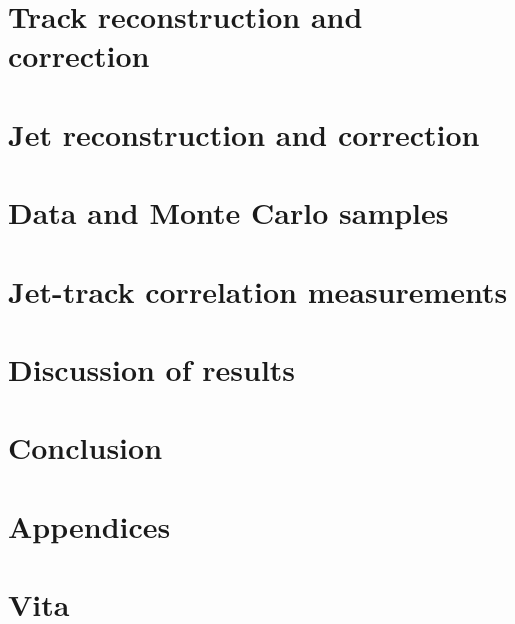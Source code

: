\documentclass[11pt]{article}
\begin{document}
\section{Track reconstruction and correction}
\label{sec:Tracks}

\clearpage

\section{Jet reconstruction and correction}
\label{sec:Jets}

\clearpage

\section{Data and Monte Carlo samples}
\label{sec:Samples}

\clearpage


\section{Jet-track correlation measurements}
\label{sec:JetTrack}

\clearpage

\section{Discussion of results}
\label{sec:Results}

\clearpage

\section{Conclusion}
\label{sec:Conclusion}

\clearpage




\clearpage


\appendix

\appendix
\section*{Appendices}
\renewcommand{\thesubsection}{\Alph{subsection}}


\clearpage

\section*{Vita}

\end{document}
